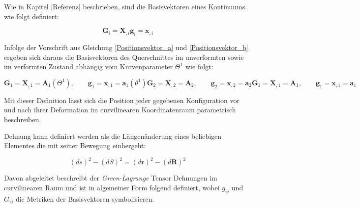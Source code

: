 \documentclass[german,a4paper,12pt,oneside]{scrbook}
\theoremstyle{definition}
\theoremstyle{definition}
\theoremstyle{definition}
\theoremstyle{definition}
\theoremstyle{definition}
\theoremstyle{definition}
\begin{document}
\vspace{0.5cm}
Wie in Kapitel [Referenz] beschrieben, sind die Basisvektoren eines Kontinuums wie folgt definiert:

\begin{subequations}
    \begin{equation}
        \bm{G}_i = \bm{X}_{,i}
    \end{equation}
    \begin{equation}
        \bm{g}_i = \bm{x}_{,i}
    \end{equation}
\end{subequations}

\vspace{0.5cm}
Infolge der Vorschrift aus Gleichung \eqref{Positionsvektor_a} und \eqref{Positionsvektor_b} ergeben sich daraus die Basisvektoren des Querschnittes im unverformten sowie im verformten Zustand abhängig vom Kurvenparameter $\Theta^1$ wie folgt: 

\begin{subequations}
    \begin{equation} \label{Basisvektor_A1}
        \bm{G}_1 = \bm{X}_{,1} = \bm{A}_1(\Theta^1), \qquad     
        \bm{g}_1 = \bm{x}_{,1} = \bm{a}_1(\theta^1)
    \end{equation}
    \begin{equation}
        \bm{G}_2 = \bm{X}_{,2} = \bm{A}_2, \qquad     
        \bm{g}_2 = \bm{x}_{,2} = \bm{a}_2
    \end{equation}
    \begin{equation} \label{Basisvektor_A3}
        \bm{G}_1 = \bm{X}_{,1} = \bm{A}_1, \qquad     
        \bm{g}_1 = \bm{x}_{,1} = \bm{a}_1
    \end{equation}
\end{subequations}

\vspace{0.5cm}
Mit dieser Definition lässt sich die Position jeder gegebenen Konfiguration vor und nach ihrer Deformation im curvilinearen Koordinatenraum parametrisch beschreiben.

\vspace{0.5cm}
Dehnung kann definiert werden als die Längenänderung eines beliebigen Elementes die mit seiner Bewegung einhergeht: 

\begin{equation}
    (ds)^2 - (dS)^2 = (d\bm{r})^2 - (d\bm{R})^2    
\end{equation}

\vspace{0.5cm}
Davon abgeleitet beschreibt der \emph{Green-Lagrange} Tensor Dehnungen im curvilinearen Raum und ist in algemeiner Form folgend definiert, wobei $g_{ij}$ und $G_{ij}$ die Metriken der Basisvektoren symbolisieren.
\end{document}
